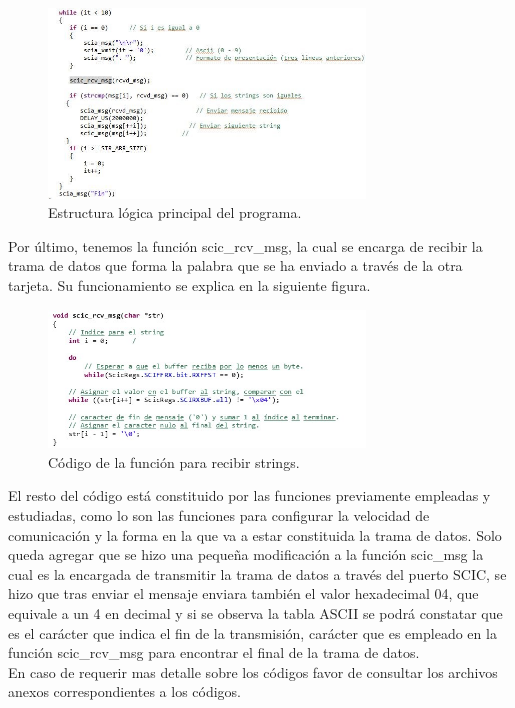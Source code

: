 \documentclass[12pt, letterpaper]{article}
\begin{document}
\begin{figure}[H]
    \centering
    \includegraphics[width=0.75\textwidth]{img/desarrollo/DES_3.jpg}
    \caption{Estructura lógica principal del programa.}
\end{figure}

Por último, tenemos la función scic\_rcv\_msg, la cual se encarga de recibir la trama de datos que forma la palabra que se ha enviado a través de la otra tarjeta. Su funcionamiento se explica en la siguiente figura.

\begin{figure}[H]
    \centering
    \includegraphics[width=0.75\textwidth]{img/desarrollo/DES_4.jpg}
    \caption{Código de la función para recibir strings.}
\end{figure}

El resto del código está constituido por las funciones previamente empleadas y estudiadas, como lo son las funciones para configurar la velocidad de comunicación y la forma en la que va a estar constituida la trama de datos. Solo queda agregar que se hizo una pequeña modificación a la función scic\_msg la cual es la encargada de transmitir la trama de datos a través del puerto SCIC, se hizo que tras enviar el mensaje enviara también el valor hexadecimal 04, que equivale a un 4 en decimal y si se observa la tabla ASCII se podrá constatar que es el carácter que indica el fin de la transmisión, carácter que es empleado en la función scic\_rcv\_msg para encontrar el final de la trama de datos.\\
En caso de requerir mas detalle sobre los códigos favor de consultar los archivos anexos correspondientes a los códigos.
\end{document}
